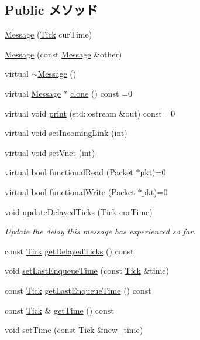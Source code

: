\subsection*{Public メソッド}
\begin{DoxyCompactItemize}
\item 
\hyperlink{classMessage_ad5b14af159b464dd3d9c26706260f0ba}{Message} (\hyperlink{base_2types_8hh_a5c8ed81b7d238c9083e1037ba6d61643}{Tick} curTime)
\item 
\hyperlink{classMessage_ac28205263989800da0204904b9475f31}{Message} (const \hyperlink{classMessage}{Message} \&other)
\item 
virtual \hyperlink{classMessage_adf3bb2d667e5391d55d9e711cdbf7da2}{$\sim$Message} ()
\item 
virtual \hyperlink{classMessage}{Message} $\ast$ \hyperlink{classMessage_a78f6e5c1dc41f5316e10bba31ee0d8a1}{clone} () const =0
\item 
virtual void \hyperlink{classMessage_a3ea5f7af5db62cc24f4e40df9ea5c971}{print} (std::ostream \&out) const =0
\item 
virtual void \hyperlink{classMessage_a744ab1b6f6e038529292528e92ecf5dc}{setIncomingLink} (int)
\item 
virtual void \hyperlink{classMessage_a95f04a7c3408d2acb1390edf886071c9}{setVnet} (int)
\item 
virtual bool \hyperlink{classMessage_a050cc08996aae4295aee40e8871788b7}{functionalRead} (\hyperlink{classPacket}{Packet} $\ast$pkt)=0
\item 
virtual bool \hyperlink{classMessage_a1a7af86f43fb867628a3c3cf76e4dcc9}{functionalWrite} (\hyperlink{classPacket}{Packet} $\ast$pkt)=0
\item 
void \hyperlink{classMessage_a505c1e462c299eb1ad016d74957777a2}{updateDelayedTicks} (\hyperlink{base_2types_8hh_a5c8ed81b7d238c9083e1037ba6d61643}{Tick} curTime)
\begin{DoxyCompactList}\small\item\em Update the delay this message has experienced so far. \item\end{DoxyCompactList}\item 
const \hyperlink{base_2types_8hh_a5c8ed81b7d238c9083e1037ba6d61643}{Tick} \hyperlink{classMessage_a63c73b634cea513a93c8379b8973e1ba}{getDelayedTicks} () const 
\item 
void \hyperlink{classMessage_a39eba4c6107adb64574da829d35df8c7}{setLastEnqueueTime} (const \hyperlink{base_2types_8hh_a5c8ed81b7d238c9083e1037ba6d61643}{Tick} \&time)
\item 
const \hyperlink{base_2types_8hh_a5c8ed81b7d238c9083e1037ba6d61643}{Tick} \hyperlink{classMessage_adbfd7f03977545143ecdcd4fef0f1d65}{getLastEnqueueTime} () const 
\item 
const \hyperlink{base_2types_8hh_a5c8ed81b7d238c9083e1037ba6d61643}{Tick} \& \hyperlink{classMessage_ad72f25ef5dc38c31b1f0c095d5796426}{getTime} () const 
\item 
void \hyperlink{classMessage_ab260496efd18d4f23502f36a1a144feb}{setTime} (const \hyperlink{base_2types_8hh_a5c8ed81b7d238c9083e1037ba6d61643}{Tick} \&new\_\-time)
\end{DoxyCompactItemize}
